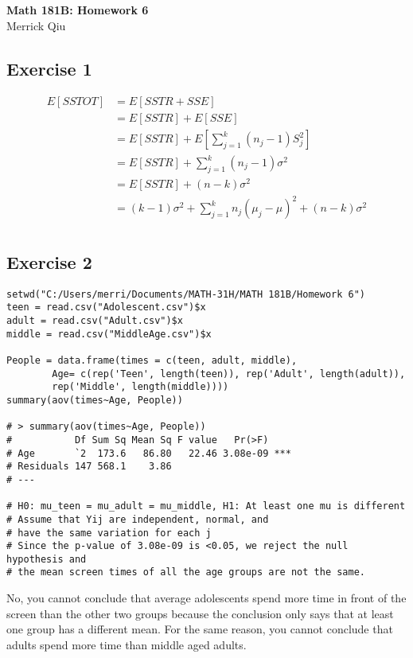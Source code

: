 \documentclass{article}
\begin{document}
\begin{center}
	\huge{\bf Math 181B: Homework 6} \\
	Merrick Qiu 
\end{center}
\subsection*{Exercise 1}
\begin{align*}
	E[SSTOT] &= E[SSTR + SSE] \\
	&= E[SSTR] + E[SSE] \\
	&= E[SSTR] + E\left[\sum_{j=1}^k (n_j-1)S_j^2\right]  \\
	&= E[SSTR] +  \sum_{j=1}^k (n_j-1)\sigma^2 \\
	&= E[SSTR] +  (n-k)\sigma^2 \\
	&= (k-1)\sigma^2 + \sum_{j=1}^k n_j(\mu_j-\mu)^2 + (n-k)\sigma^2 \\
\end{align*}
\newpage

\subsection*{Exercise 2}
\begin{lstlisting}
setwd("C:/Users/merri/Documents/MATH-31H/MATH 181B/Homework 6")
teen = read.csv("Adolescent.csv")$x
adult = read.csv("Adult.csv")$x
middle = read.csv("MiddleAge.csv")$x

People = data.frame(times = c(teen, adult, middle), 
		Age= c(rep('Teen', length(teen)), rep('Adult', length(adult)),
		rep('Middle', length(middle))))
summary(aov(times~Age, People))

# > summary(aov(times~Age, People))
#           Df Sum Sq Mean Sq F value   Pr(>F)    
# Age       `2  173.6   86.80   22.46 3.08e-09 ***
# Residuals 147 568.1    3.86                     
# ---

# H0: mu_teen = mu_adult = mu_middle, H1: At least one mu is different
# Assume that Yij are independent, normal, and 
# have the same variation for each j
# Since the p-value of 3.08e-09 is <0.05, we reject the null hypothesis and 
# the mean screen times of all the age groups are not the same.
\end{lstlisting}

No, you cannot conclude that average adolescents spend more time in front of the screen
than the other two groups because the conclusion only says that at least one group
has a different mean. 
For the same reason, you cannot conclude that adults spend more time than middle aged adults.
\end{document}
